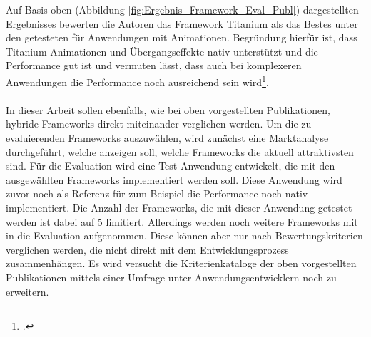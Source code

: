 Auf Basis oben (Abbildung \ref{fig:Ergebnis_Framework_Eval_Publ}) dargestellten Ergebnisses bewerten die Autoren das Framework Titanium als das Bestes unter den getesteten für Anwendungen mit Animationen. Begründung hierfür ist, dass Titanium Animationen und Übergangseffekte nativ unterstützt und die Performance gut ist und vermuten lässt, dass auch bei komplexeren Anwendungen die Performance noch ausreichend sein wird\footcite{CrossPlatMobDevStudyAnim}. 
\\
\\
In dieser Arbeit sollen ebenfalls, wie bei oben vorgestellten Publikationen, hybride Frameworks direkt miteinander verglichen werden. Um die zu evaluierenden Frameworks auszuwählen, wird zunächst eine Marktanalyse durchgeführt, welche anzeigen soll, welche Frameworks die aktuell attraktivsten sind. Für die Evaluation wird eine Test-Anwendung entwickelt, die mit den ausgewählten Frameworks implementiert werden soll. Diese Anwendung wird zuvor noch als Referenz für zum Beispiel die Performance noch nativ implementiert. Die Anzahl der Frameworks, die mit dieser Anwendung getestet werden ist dabei auf 5 limitiert. Allerdings werden noch weitere Frameworks mit in die Evaluation aufgenommen. Diese können aber nur nach Bewertungskriterien verglichen werden, die nicht direkt mit dem Entwicklungsprozess zusammenhängen. Es wird versucht die Kriterienkataloge der oben vorgestellten Publikationen mittels einer Umfrage unter Anwendungsentwicklern noch zu erweitern.  

